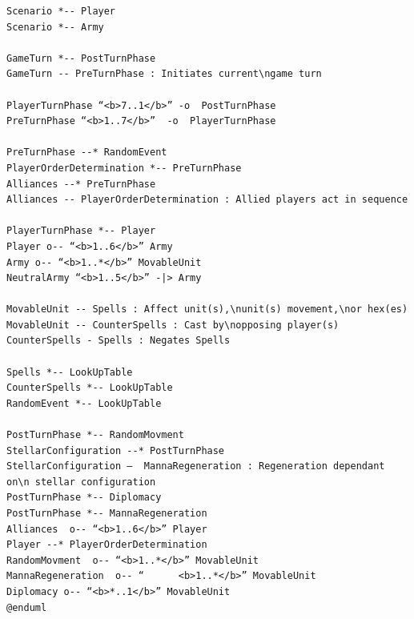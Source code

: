 \documentclass[12pt,a4paper]{article}
\begin{document}
\begin{verbatim}
Scenario *-- Player
Scenario *-- Army

GameTurn *-- PostTurnPhase 
GameTurn -- PreTurnPhase : Initiates current\ngame turn 

PlayerTurnPhase “<b>7..1</b>” -o  PostTurnPhase
PreTurnPhase “<b>1..7</b>”  -o  PlayerTurnPhase

PreTurnPhase --* RandomEvent
PlayerOrderDetermination *-- PreTurnPhase
Alliances --* PreTurnPhase
Alliances -- PlayerOrderDetermination : Allied players act in sequence

PlayerTurnPhase *-- Player
Player o-- “<b>1..6</b>” Army
Army o-- “<b>1..*</b>” MovableUnit
NeutralArmy “<b>1..5</b>” -|> Army

MovableUnit -- Spells : Affect unit(s),\nunit(s) movement,\nor hex(es)  
MovableUnit -- CounterSpells : Cast by\nopposing player(s)
CounterSpells - Spells : Negates Spells

Spells *-- LookUpTable
CounterSpells *-- LookUpTable
RandomEvent *-- LookUpTable

PostTurnPhase *-- RandomMovment
StellarConfiguration --* PostTurnPhase
StellarConfiguration –  MannaRegeneration : Regeneration dependant on\n stellar configuration
PostTurnPhase *-- Diplomacy
PostTurnPhase *-- MannaRegeneration
Alliances  o-- “<b>1..6</b>” Player
Player --* PlayerOrderDetermination
RandomMovment  o-- “<b>1..*</b>” MovableUnit 
MannaRegeneration  o-- “      <b>1..*</b>” MovableUnit
Diplomacy o-- “<b>*..1</b>” MovableUnit
@enduml
\end{verbatim}
\end{document}
